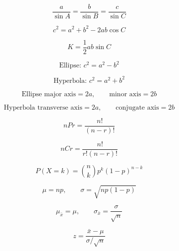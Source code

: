 \documentclass[11pt]{article}
\begin{document}
\[
\frac{a}{\sin A}=\frac{b}{\sin B}=\frac{c}{\sin C}
\]

\[
c^2=a^2+b^2-2ab\cos C
\]

\[
K=\frac{1}{2}ab\sin C
\]

\[
\text{Ellipse: }c^2=a^2-b^2
\]

\[
\text{Hyperbola: }c^2=a^2+b^2
\]

\[
\text{Ellipse major axis}=2a,\qquad \text{minor axis}=2b
\]

\[
\text{Hyperbola transverse axis}=2a,\qquad \text{conjugate axis}=2b
\]

\[
nPr=\frac{n!}{(n-r)!}
\]

\[
nCr=\frac{n!}{r!(n-r)!}
\]

\[
P(X=k)={n\choose k}p^k(1-p)^{n-k}
\]

\[
\mu=np,\qquad \sigma=\sqrt{np(1-p)}
\]

\[
\mu_{\bar{x}}=\mu,\qquad \sigma_{\bar{x}}=\frac{\sigma}{\sqrt{n}}
\]

\[
z=\frac{\bar{x}-\mu}{\sigma/\sqrt{n}}
\]
\end{document}
